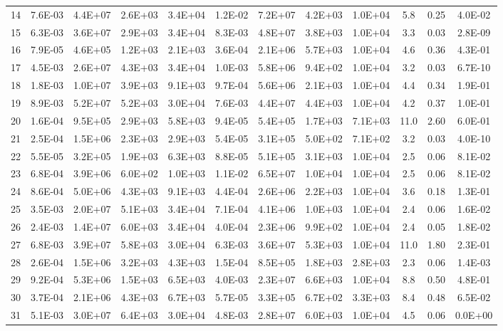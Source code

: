 \begin{tabular}{cccccccccccc}
14 & 7.6E-03 & 4.4E+07 & 2.6E+03 & 3.4E+04 & 1.2E-02 & 7.2E+07 & 4.2E+03 & 1.0E+04 & 5.8 & 0.25 & 4.0E-02 \\
15 & 6.3E-03 & 3.6E+07 & 2.9E+03 & 3.4E+04 & 8.3E-03 & 4.8E+07 & 3.8E+03 & 1.0E+04 & 3.3 & 0.03 & 2.8E-09 \\
16 & 7.9E-05 & 4.6E+05 & 1.2E+03 & 2.1E+03 & 3.6E-04 & 2.1E+06 & 5.7E+03 & 1.0E+04 & 4.6 & 0.36 & 4.3E-01 \\
17 & 4.5E-03 & 2.6E+07 & 4.3E+03 & 3.4E+04 & 1.0E-03 & 5.8E+06 & 9.4E+02 & 1.0E+04 & 3.2 & 0.03 & 6.7E-10 \\
18 & 1.8E-03 & 1.0E+07 & 3.9E+03 & 9.1E+03 & 9.7E-04 & 5.6E+06 & 2.1E+03 & 1.0E+04 & 4.4 & 0.34 & 1.9E-01 \\
19 & 8.9E-03 & 5.2E+07 & 5.2E+03 & 3.0E+04 & 7.6E-03 & 4.4E+07 & 4.4E+03 & 1.0E+04 & 4.2 & 0.37 & 1.0E-01 \\
20 & 1.6E-04 & 9.5E+05 & 2.9E+03 & 5.8E+03 & 9.4E-05 & 5.4E+05 & 1.7E+03 & 7.1E+03 & 11.0 & 2.60 & 6.0E-01 \\
21 & 2.5E-04 & 1.5E+06 & 2.3E+03 & 2.9E+03 & 5.4E-05 & 3.1E+05 & 5.0E+02 & 7.1E+02 & 3.2 & 0.03 & 4.0E-10 \\
22 & 5.5E-05 & 3.2E+05 & 1.9E+03 & 6.3E+03 & 8.8E-05 & 5.1E+05 & 3.1E+03 & 1.0E+04 & 2.5 & 0.06 & 8.1E-02 \\
23 & 6.8E-04 & 3.9E+06 & 6.0E+02 & 1.0E+03 & 1.1E-02 & 6.5E+07 & 1.0E+04 & 1.0E+04 & 2.5 & 0.06 & 8.1E-02 \\
24 & 8.6E-04 & 5.0E+06 & 4.3E+03 & 9.1E+03 & 4.4E-04 & 2.6E+06 & 2.2E+03 & 1.0E+04 & 3.6 & 0.18 & 1.3E-01 \\
25 & 3.5E-03 & 2.0E+07 & 5.1E+03 & 3.4E+04 & 7.1E-04 & 4.1E+06 & 1.0E+03 & 1.0E+04 & 2.4 & 0.06 & 1.6E-02 \\
26 & 2.4E-03 & 1.4E+07 & 6.0E+03 & 3.4E+04 & 4.0E-04 & 2.3E+06 & 9.9E+02 & 1.0E+04 & 2.4 & 0.05 & 1.8E-02 \\
27 & 6.8E-03 & 3.9E+07 & 5.8E+03 & 3.0E+04 & 6.3E-03 & 3.6E+07 & 5.3E+03 & 1.0E+04 & 11.0 & 1.80 & 2.3E-01 \\
28 & 2.6E-04 & 1.5E+06 & 3.2E+03 & 4.3E+03 & 1.5E-04 & 8.5E+05 & 1.8E+03 & 2.8E+03 & 2.3 & 0.06 & 1.4E-03 \\
29 & 9.2E-04 & 5.3E+06 & 1.5E+03 & 6.5E+03 & 4.0E-03 & 2.3E+07 & 6.6E+03 & 1.0E+04 & 8.8 & 0.50 & 4.8E-01 \\
30 & 3.7E-04 & 2.1E+06 & 4.3E+03 & 6.7E+03 & 5.7E-05 & 3.3E+05 & 6.7E+02 & 3.3E+03 & 8.4 & 0.48 & 6.5E-02 \\
31 & 5.1E-03 & 3.0E+07 & 6.4E+03 & 3.0E+04 & 4.8E-03 & 2.8E+07 & 6.0E+03 & 1.0E+04 & 4.5 & 0.06 & 0.0E+00 \\

\end{tabular}
